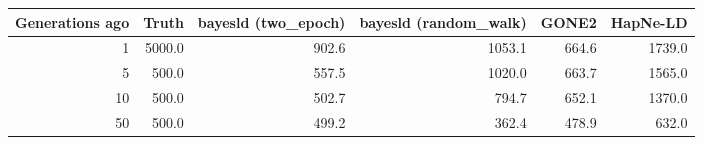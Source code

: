 \begin{tabular}{rrrrrr}
\toprule
Generations ago & Truth & bayesld (two_epoch) & bayesld (random_walk) & GONE2 & HapNe-LD \\
\midrule
1 & 5000.0 & 902.6 & 1053.1 & 664.6 & 1739.0 \\
5 & 500.0 & 557.5 & 1020.0 & 663.7 & 1565.0 \\
10 & 500.0 & 502.7 & 794.7 & 652.1 & 1370.0 \\
50 & 500.0 & 499.2 & 362.4 & 478.9 & 632.0 \\
\bottomrule
\end{tabular}
